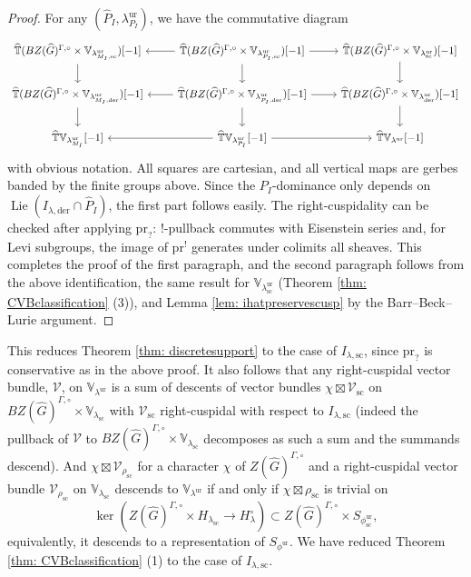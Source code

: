 \documentclass{amsart}
\theoremstyle{definition}
\theoremstyle{remark}
\numberwithin{equation}{section}
\DeclareMathOperator{\Lie}{Lie}
\newcommand{\der}{\mathrm{der}}
\newcommand{\mc}{\mathcal}
\newcommand{\Sc}{\mathrm{sc}}
\newcommand{\wh}{\widehat}
\newcommand{\ur}{\mathrm{ur}}
\newcommand{\V}{\mathbb{V}}
\newcommand{\T}{\mathbb{T}}
\begin{document}
\begin{proof}
For any $(\wh P_I, \lambda^\ur_{P_I})$, we have the commutative diagram 
\[
\begin{tikzcd}
    \wh{\T}(BZ(\wh G)^{\Gamma,\circ}\times \V_{\lambda_{M_I, \Sc}^{\ur}})[-1] \arrow[d] & \arrow[l] \wh{\T}(BZ(\wh G)^{\Gamma, \circ}\times \V_{\lambda_{P_I, \Sc}^{\ur}})[-1] \arrow[d] \arrow[r] & \wh{\T}(BZ(\wh G)^{\Gamma,\circ}\times \V_{\lambda_{\Sc}^{\ur}})[-1] \arrow[d] \\
    \wh{\T}(BZ(\wh G)^{\Gamma,\circ}\times \V_{\lambda_{M_I, \der}^{\ur}})[-1] \arrow[d] & \arrow[l] \wh{\T}(BZ(\wh G)^{\Gamma, \circ}\times \V_{\lambda_{P_I, \der}^{\ur}})[-1] \arrow[d] \arrow[r] & \wh{\T}(BZ(\wh G)^{\Gamma,\circ}\times \V_{\lambda_{\der}^{\ur}})[-1] \arrow[d] \\
    \wh{\T}\V_{\lambda^\ur_{M_I}}[-1]  & \arrow[l] \wh{\T}\V_{\lambda^\ur_{P_I}}[-1] \arrow[r] & \wh{\T}\V_{\lambda^\ur}[-1]
\end{tikzcd}
\]
with obvious notation. All squares are cartesian, and all vertical maps are gerbes banded by the finite groups above. Since the $P_I$-dominance only depends on $\Lie (I_{\lambda, \der}\cap \wh P_{I})$, the first part follows easily. The right-cuspidality can be checked after applying $\mathrm{pr}_?$: $!$-pullback commutes with Eisenstein series and, for Levi subgroups, the image of $\mathrm{pr}^!$ generates under colimits all sheaves. This completes the proof of the first paragraph, and the second paragraph follows from the above identification, the same result for $\V_{\lambda^{\ur}_{\Sc}}$ (Theorem \ref{thm: CVBclassification} (3)), and Lemma \ref{lem: ihatpreservescusp} by the Barr--Beck--Lurie argument. 
\end{proof}

This reduces Theorem \ref{thm: discretesupport} to the case of $I_{\lambda, \Sc}$, since $\mathrm{pr}_?$ is conservative as in the above proof. It also follows that any right-cuspidal vector bundle, $\mc{V}$, on $\V_{\lambda^\ur}$ is a sum of descents of vector bundles $\chi \boxtimes \mc V_{\Sc}$ on $BZ(\wh G)^{\Gamma,\circ}\times \V_{\lambda_\Sc}$ with $\mc V_{\Sc}$ right-cuspidal  with respect to $I_{\lambda, \Sc}$ (indeed the pullback of $\mc{V}$ to $BZ(\wh G)^{\Gamma,\circ}\times \V_{\lambda_\Sc}$ decomposes as such a sum and the summands descend). And $\chi \boxtimes \mc V_{\rho_\Sc}$ for a character $\chi$ of $Z(\wh G)^{\Gamma, \circ}$ and a right-cuspidal vector bundle $\mc V_{\rho_{\Sc}}$ on $\V_{\lambda_\Sc}$ descends to $\V_{\lambda^\ur}$ if and only if $\chi\boxtimes \rho_{\Sc}$ is trivial on
\[
\ker (Z(\wh G)^{\Gamma, \circ}\times H_{\lambda_\Sc} \to H_{\lambda}^\circ) \subset Z(\wh G)^{\Gamma, \circ}\times S_{\phi_\Sc^\ur}, 
\]
equivalently, it descends to a representation of $S_{\phi^\ur}$. We have reduced Theorem \ref{thm: CVBclassification} (1) to the case of $I_{\lambda,\Sc}$. 
\end{document}
